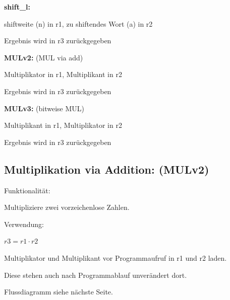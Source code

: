 \documentclass[fleqn, a4paper, 11pt]{article}       %
\begin{document}
  \vspace{0.2cm}

 \noindent \textbf{shift\_l:}
 \begin{compactitem}
     \item shiftweite (n) in r1, zu shiftendes Wort (a) in r2
     \item Ergebnis wird in r3 zurückgegeben
     \end{compactitem}
  
   \vspace{0.25cm}

 \noindent \textbf{MULv2:}  (MUL via add)
 \begin{compactitem}
     \item Multiplikator in r1, Multiplikant in r2
     \item Ergebnis wird in r3 zurückgegeben
     \end{compactitem}
   
    \vspace{0.25cm}

 \noindent \textbf{MULv3:}  (bitweise MUL)
 \begin{compactitem}
     \item Multiplikant in r1, Multiplikator in r2
     \item Ergebnis wird in r3 zurückgegeben
     \end{compactitem}


\newpage

\subsection{Multiplikation via Addition: (MULv2)\label{A.MULv2}}
Funktionalität: 

Multipliziere zwei vorzeichenlose Zahlen.
\vspace{0.25cm}

\noindent Verwendung:
\begin{compactitem}
    \item $r3 = r1 \cdot r2$
	\item Multiplikator und Multiplikant vor Programmaufruf  in r1  und r2 laden.
	\item Diese stehen auch nach Programmablauf unverändert   dort.
\end{compactitem}
\vspace{0.25cm}
\noindent Flussdiagramm siehe nächste Seite.



\newpage
\end{document}

